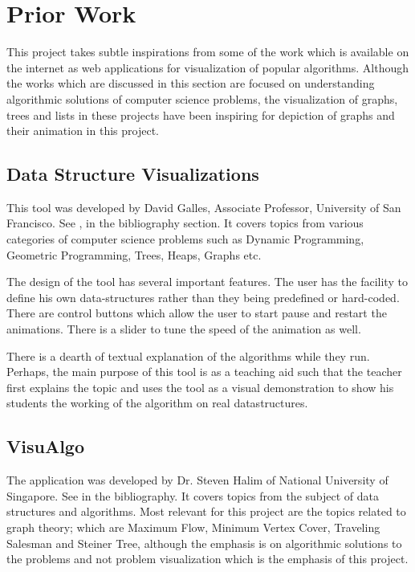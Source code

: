 \section{Prior Work}
This project takes subtle inspirations from some of the work which is available
on the internet as web applications for visualization of popular algorithms.
Although the works which are discussed in this section are focused on
understanding algorithmic solutions of computer science problems, the
visualization of graphs, trees and lists in these projects have been inspiring
for depiction of graphs and their animation in this project.

\subsection{Data Structure Visualizations}
\label{priorWork: datastrucvisu}
This tool was developed by David Galles, Associate Professor, University of San
Francisco. See \cite{Galles}, in the bibliography section.  It covers topics
from various categories of computer science problems such as Dynamic
Programming, Geometric Programming, Trees, Heaps, Graphs etc.

The design of the tool has several important features. The user has the
facility to define his own data-structures rather than they being predefined or
hard-coded. There are control buttons which allow the user to start pause and
restart the animations. There is a slider to tune the speed of the animation as
well.

There is a dearth of textual explanation of the algorithms while they run.
Perhaps, the main purpose of this tool is as a teaching aid such that the
teacher first explains the topic and uses the tool as a visual demonstration to
show his students the working of the algorithm on real datastructures.

\subsection{VisuAlgo}
\label{priorWork: visualgo}
The application was developed by Dr. Steven Halim of National University of
Singapore. See \cite{HalimVisu} in the bibliography. It covers topics from the
subject of data structures and algorithms. Most relevant for this project are
the topics related to graph theory; which are Maximum Flow, Minimum Vertex
Cover, Traveling Salesman and Steiner Tree, although the emphasis is on
algorithmic solutions to the problems and not problem visualization which is
the emphasis of this project.

